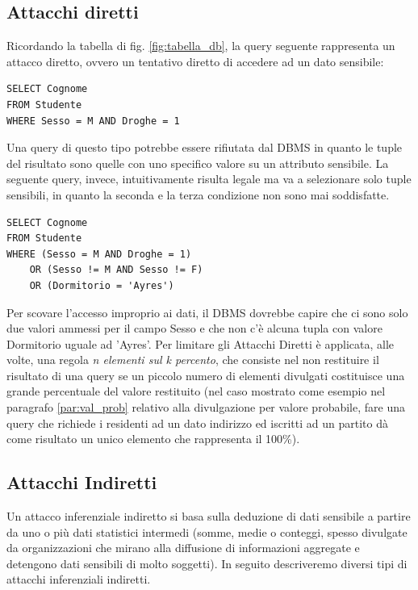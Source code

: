 \subsection{Attacchi diretti}
Ricordando la tabella di fig. \ref{fig:tabella_db}, la query seguente rappresenta un attacco diretto, ovvero un tentativo diretto di accedere ad un dato sensibile:

\begin{algorithm}
\begin{lstlisting}[caption={Query che sfrutta inferenza per ottenere dati sensibili e viene bloccata}]
SELECT Cognome
FROM Studente
WHERE Sesso = M AND Droghe = 1
\end{lstlisting}
\end{algorithm}

Una query di questo tipo potrebbe essere rifiutata dal DBMS in quanto le tuple del risultato sono quelle con uno specifico valore su un attributo sensibile. La seguente query, invece, intuitivamente risulta legale ma va a selezionare solo tuple sensibili, in quanto la seconda e la terza condizione non sono mai soddisfatte.

\begin{algorithm}
\begin{lstlisting}[caption={Query che sfrutta inferenza per ottenere dati sensibili e non viene bloccata}]
SELECT Cognome
FROM Studente
WHERE (Sesso = M AND Droghe = 1)
	OR (Sesso != M AND Sesso != F)
	OR (Dormitorio = 'Ayres')
\end{lstlisting}
\end{algorithm}

Per scovare l'accesso improprio ai dati, il DBMS dovrebbe capire che ci sono solo due valori ammessi per il campo Sesso e che non c'è alcuna tupla con valore Dormitorio uguale ad 'Ayres'. Per limitare gli Attacchi Diretti è applicata, alle volte, una regola \textit{n elementi sul k percento}, che consiste nel non restituire il risultato di una query se un piccolo numero di elementi divulgati costituisce una grande percentuale del valore restituito (nel caso mostrato come esempio nel paragrafo \ref{par:val_prob} relativo alla divulgazione per valore probabile, fare una query che richiede i residenti ad un dato indirizzo ed iscritti ad un partito dà come risultato un unico elemento che rappresenta il 100\%).

\subsection{Attacchi Indiretti}
Un attacco inferenziale indiretto si basa sulla deduzione di dati sensibile a partire da uno o più dati statistici intermedi (somme, medie o conteggi, spesso divulgate da organizzazioni che mirano alla diffusione di informazioni aggregate e detengono dati sensibili di molto soggetti). In seguito descriveremo diversi tipi di attacchi inferenziali indiretti.

